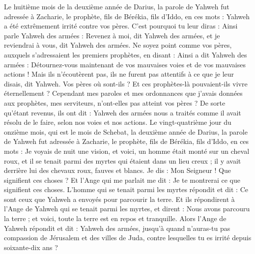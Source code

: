 \begin{multicols}{2}
\VerseOne{}Le huitième mois de la deuxième année de Darius, la parole de Yahweh fut adressée à Zacharie, le prophète, fils de Bérékia, fils d’Iddo, en ces mots :
Yahweh a été extrêmement irrité contre vos pères.
C'est pourquoi tu leur diras : Ainsi parle Yahweh des armées : Revenez à moi, dit Yahweh des armées, et je reviendrai à vous, dit Yahweh des armées.
Ne soyez point comme vos pères, auxquels s’adressaient les premiers prophètes, en disant : Ainsi a dit Yahweh des armées : Détournez-vous maintenant de vos mauvaises voies et de vos mauvaises actions ! Mais ils n’écoutèrent pas, ils ne furent pas attentifs à ce que je leur disais, dit Yahweh.
Vos pères où sont-ils ? Et ces prophètes-là pouvaient-ils vivre éternellement ?
Cependant mes paroles et mes ordonnances que j'avais données aux prophètes, mes serviteurs, n'ont-elles pas atteint vos pères ? De sorte qu’étant revenus, ils ont dit : Yahweh des armées nous a traités comme il avait résolu de le faire, selon nos voies et nos actions.
Le vingt-quatrième jour du onzième mois, qui est le mois de Schebat, la deuxième année de Darius, la parole de Yahweh fut adressée à Zacharie, le prophète, fils de Bérékia, fils d’Iddo, en ces mots :
Je voyais de nuit une vision, et voici, un homme était monté sur un cheval roux, et il se tenait parmi des myrtes qui étaient dans un lieu creux ; il y avait derrière lui des chevaux roux, fauves et blancs.
Je dis : Mon Seigneur ! Que signifient ces choses ? Et l’Ange qui me parlait me dit : Je te montrerai ce que signifient ces choses.
L’homme qui se tenait parmi les myrtes répondit et dit : Ce sont ceux que Yahweh a envoyés pour parcourir la terre.
Et ils répondirent à l'Ange de Yahweh qui se tenait parmi les myrtes, et dirent : Nous avons parcouru la terre ; et voici, toute la terre est en repos et tranquille.
Alors l'Ange de Yahweh répondit et dit : Yahweh des armées, jusqu'à quand n'auras-tu pas compassion de Jérusalem et des villes de Juda, contre lesquelles tu es irrité depuis soixante-dix ans ?

\end{multicols}
